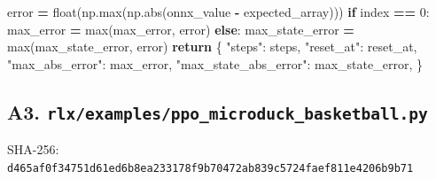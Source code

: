 \documentclass[
  chinese,
  11pt,
  letterpaper,
]{article}
\newenvironment{Shaded}{\begin{snugshade}}{\end{snugshade}}
\newcommand{\BuiltInTok}[1]{#1}
\newcommand{\ControlFlowTok}[1]{\textcolor[rgb]{0.13,0.29,0.53}{\textbf{#1}}}
\newcommand{\DecValTok}[1]{\textcolor[rgb]{0.00,0.00,0.81}{#1}}
\newcommand{\NormalTok}[1]{#1}
\newcommand{\OperatorTok}[1]{\textcolor[rgb]{0.81,0.36,0.00}{\textbf{#1}}}
\newcommand{\StringTok}[1]{\textcolor[rgb]{0.31,0.60,0.02}{#1}}
\renewenvironment{Shaded}{\par\smallskip}{\par\smallskip}
\begin{document}
\begin{Shaded}
\begin{Highlighting}[]
\NormalTok{                error }\OperatorTok{=} \BuiltInTok{float}\NormalTok{(np.}\BuiltInTok{max}\NormalTok{(np.}\BuiltInTok{abs}\NormalTok{(onnx\_value }\OperatorTok{{-}}\NormalTok{ expected\_array)))}
                \ControlFlowTok{if}\NormalTok{ index }\OperatorTok{==} \DecValTok{0}\NormalTok{:}
\NormalTok{                    max\_error }\OperatorTok{=} \BuiltInTok{max}\NormalTok{(max\_error, error)}
                \ControlFlowTok{else}\NormalTok{:}
\NormalTok{                    max\_state\_error }\OperatorTok{=} \BuiltInTok{max}\NormalTok{(max\_state\_error, error)}
    \ControlFlowTok{return}\NormalTok{ \{}
        \StringTok{"steps"}\NormalTok{: steps, }\StringTok{"reset\_at"}\NormalTok{: reset\_at, }\StringTok{"max\_abs\_error"}\NormalTok{: max\_error,}
        \StringTok{"max\_state\_abs\_error"}\NormalTok{: max\_state\_error,}
\NormalTok{    \}}
\end{Highlighting}
\end{Shaded}

\subsection{\texorpdfstring{A3.
\texttt{rlx/\allowbreak{}examples\allowbreak{}/\allowbreak{}ppo\_\allowbreak{}microduc\allowbreak{}k\_\allowbreak{}basketba\allowbreak{}ll.py}}{A3. }}\label{a3.-rlxexamplesppo_microduck_basketball.py}

SHA-256:
\texttt{d465af0f\allowbreak{}34751d61\allowbreak{}ed6b8ea2\allowbreak{}33178f9b\allowbreak{}70472ab8\allowbreak{}39c5724f\allowbreak{}aef811e4\allowbreak{}206b9b71\allowbreak{}}
\end{document}
